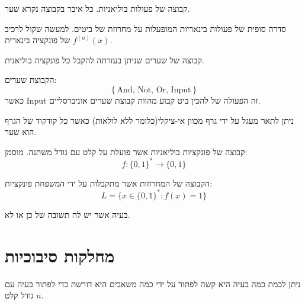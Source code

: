 \documentclass{tstextbook}
\begin{document}
\begin{definition}
קבוצה של פעולות בוליאניות. כל איבר בקבוצה נקרא שער.

\end{definition}
\begin{definition}
סדרה סופית של פעולות בינאריות המופעלות על מחרוזת של ביטים. למעשה שקול לרכיב \(f^{(a)}(x)\) של פונקציה בינארית.

\end{definition}
\begin{definition}
קבוצה של שערים שניתן בעזרתה להקבל כל פונקציה בוליאנית.

\end{definition}
\begin{example}
הקבוצת שערים:
$$\left\{  \text{And, Not, Or, Input}  \right\}$$
כאשר Input זה הפעולה של להכין ביט קבוע מהוות קבוצת שערים אוניברסליים.

\end{example}
\begin{proposition}
ניתן לתאר מעגל על ידי גרף מכוון אי-ציקלי(כלומר ללא לולאות) כאשר כל קודקוד של הגרף הוא שער.

\end{proposition}
\begin{definition}
קבוצה של פונקציות בוליאניות אשר פועלת על קלט עם גודל משתנה.  מוסמן:
$$f:\{0,1\}^{*}\to\{0,1\}$$

\end{definition}
\begin{definition}[שפה]
הקבוצה של המחרוזות אשר מתקבלות על ידי המשפחת פונקציות:
$$L=\{x\in\{0,1\}^{*}:f(x)=1\}$$

\end{definition}
\begin{definition}
בעיה אשר יש לה תשובה של כן או לא.

\end{definition}
\section{מחלקות סיבוכיות}

ניתן לכמת כמה בעיה היא קשה לפתור על ידי כמה משאבים היא דורשת כדי לפתור בעיה עם גודל קלט \(n\).
\end{document}
